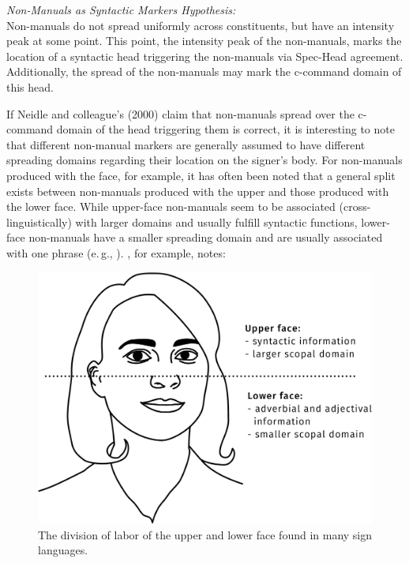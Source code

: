 \begin{exe}
\ex \textit{Non-Manuals as Syntactic Markers Hypothesis:}\\
Non-manuals do not spread uniformly across constituents, but have an intensity peak at some point. This point, the intensity peak of the non-manuals, marks the location of a syntactic head triggering the non-manuals via Spec-Head agreement. Additionally, the spread of the non-manuals may mark the c-command domain of this head. \label{nmasmh}
\end{exe}

\noindent If Neidle and colleague's (2000) claim that non-manuals spread over the c-command domain of the head triggering them is correct, it is interesting to note that different non-manual markers are generally assumed to have different spreading domains regarding their location on the signer's body. For non-manuals produced with the face, for example, it has often been noted that a general split exists between non-manuals produced with the upper and those produced with the lower face. While upper-face non-manuals seem to be associated (cross-linguistically) with larger domains and usually fulfill syntactic functions, lower-face non-manuals have a smaller spreading domain and are usually associated with one phrase (e.\,g., \citealt{liddell1980american, coerts1992nonmanual, wilbur2000phonological, wilbur2003modality, brentari2002prosody}). \citet[249]{wilbur2009productive}, for example, notes: 

\begin{figure}[bt]
\centering
	\includegraphics[width=1.0\textwidth]{face.jpg}
	\caption{The division of labor of the upper and lower face found in many sign languages.}
	\label{upperlowerfacedivisionoflabour}
\end{figure}

